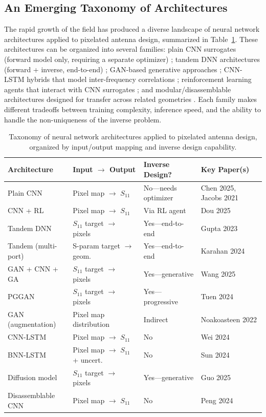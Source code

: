 \subsection{An Emerging Taxonomy of Architectures}

The rapid growth of the field has produced a diverse landscape of neural network architectures applied to pixelated antenna design, summarized in Table~\ref{tab:AI_taxonomy}.  These architectures can be organized into several families: plain CNN surrogates (forward model only, requiring a separate optimizer) \cite{Chen2025InverseDesignDL, Jacobs2021CNN, Wu2024MLGeometry}; tandem DNN architectures (forward + inverse, end-to-end) \cite{Gupta2023Tandem, Karahan2024NatComms}; GAN-based generative approaches \cite{Noakoasteen2022GAN, Wang2025GANCNN, Tuen2024PGGAN}; CNN-LSTM hybrids that model inter-frequency correlations \cite{Wei2024CNNLSTM, Sun2024BNNLSTM}; reinforcement learning agents that interact with CNN surrogates \cite{Wang2024Bandwidth, Dou2025CNN}; and modular/disassemblable architectures designed for transfer across related geometries \cite{Peng2024Disassemblable}.  Each family makes different tradeoffs between training complexity, inference speed, and the ability to handle the non-uniqueness of the inverse problem.

\begin{table}
\centering
\caption[Taxonomy of neural network architectures for pixelated antenna design]{Taxonomy of neural network architectures applied to pixelated antenna design, organized by input/output mapping and inverse design capability.}
\label{tab:AI_taxonomy}
\small
\begin{tabular}{llll}
\hline
\textbf{Architecture} & \textbf{Input $\rightarrow$ Output} & \textbf{Inverse Design?} & \textbf{Key Paper(s)} \\
\hline
Plain CNN & Pixel map $\rightarrow$ $S_{11}$ & No---needs optimizer & Chen 2025, Jacobs 2021 \\
CNN + RL & Pixel map $\rightarrow$ $S_{11}$ & Via RL agent & Dou 2025 \\
Tandem DNN & $S_{11}$ target $\rightarrow$ pixels & Yes---end-to-end & Gupta 2023 \\
Tandem (multi-port) & S-param target $\rightarrow$ geom. & Yes---end-to-end & Karahan 2024 \\
GAN + CNN + GA & $S_{11}$ target $\rightarrow$ pixels & Yes---generative & Wang 2025 \\
PGGAN & $S_{11}$ target $\rightarrow$ pixels & Yes---progressive & Tuen 2024 \\
GAN (augmentation) & Pixel map distribution & Indirect & Noakoasteen 2022 \\
CNN-LSTM & Pixel map $\rightarrow$ $S_{11}$ & No & Wei 2024 \\
BNN-LSTM & Pixel map $\rightarrow$ $S_{11}$ + uncert. & No & Sun 2024 \\
Diffusion model & $S_{11}$ target $\rightarrow$ pixels & Yes---generative & Guo 2025 \\
Disassemblable CNN & Pixel map $\rightarrow$ $S_{11}$ & No & Peng 2024 \\
\hline
\end{tabular}
\end{table}

